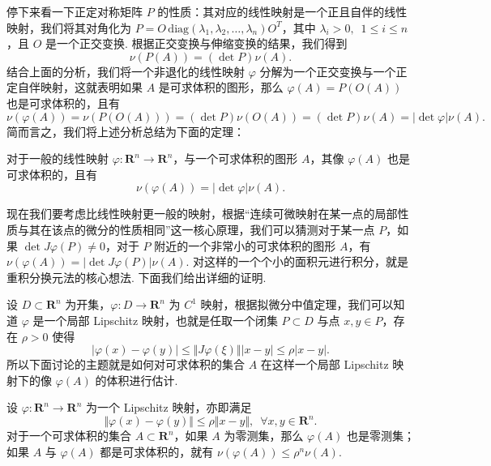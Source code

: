 停下来看一下正定对称矩阵 $P$ 的性质：其对应的线性映射是一个正且自伴的线性映射，我们将其对角化为 $P = O\,\mathrm{diag}(\lambda_1, \lambda_2, \dots, \lambda_n) O^T$，其中 $\lambda_i > 0,\enspace 1\leqslant i\leqslant n$，且 $O$ 是一个正交变换. 根据正交变换与伸缩变换的结果，我们得到 \[\nu(P(A)) = (\det P)\nu(A).\]
结合上面的分析，我们将一个非退化的线性映射 $\varphi$ 分解为一个正交变换与一个正定自伴映射，这就表明如果 $A$ 是可求体积的图形，那么 $\varphi(A) = P(O(A))$ 也是可求体积的，且有 \[\nu(\varphi(A)) = \nu(P(O(A))) = (\det P)\nu(O(A)) = (\det P)\nu(A) = \vert\det\varphi\vert \nu(A).\]
简而言之，我们将上述分析总结为下面的定理：

\begin{theorem}{}{}
    对于一般的线性映射 $\varphi: \mathbf{R}^n\to \mathbf{R}^n$，与一个可求体积的图形 $A$，其像 $\varphi(A)$ 也是可求体积的，且有 \[\nu(\varphi(A)) = \vert\det\varphi\vert \nu(A).\]
\end{theorem}

现在我们要考虑比线性映射更一般的映射，根据“连续可微映射在某一点的局部性质与其在该点的微分的性质相同”这一核心原理，我们可以猜测对于某一点 $P$，如果 $\det J\varphi(P)\neq 0$，对于 $P$ 附近的一个非常小的可求体积的图形 $A$，有 $\nu(\varphi(A)) = \vert\det J\varphi(P)\vert \nu(A)$. 对这样的一个个小的面积元进行积分，就是重积分换元法的核心想法. 下面我们给出详细的证明.

设 $D\subset \mathbf{R}^n$ 为开集，$\varphi: D\to \mathbf{R}^n$ 为 $C^1$ 映射，根据拟微分中值定理，我们可以知道 $\varphi$ 是一个局部 Lipschitz 映射，也就是任取一个闭集 $P\subset D$ 与点 $x, y\in P$，存在 $\rho > 0$ 使得 \[\vert \varphi(x) - \varphi(y)\vert \leqslant \Vert J\varphi(\xi)\Vert \vert x - y\vert \leqslant \rho \vert x - y\vert.\]
所以下面讨论的主题就是如何对可求体积的集合 $A$ 在这样一个局部 Lipschitz 映射下的像 $\varphi(A)$ 的体积进行估计.

\begin{lemma}{}{}
    设 $\varphi:\mathbf{R}^n\to \mathbf{R}^n$ 为一个 Lipschitz 映射，亦即满足\[\Vert \varphi(x) - \varphi(y)\Vert \leqslant \rho \Vert x - y\Vert,\enspace \forall x, y\in\mathbf{R}^n.\]
    对于一个可求体积的集合 $A\subset \mathbf{R}^n$，如果 $A$ 为零测集，那么 $\varphi(A)$ 也是零测集；如果 $A$ 与 $\varphi(A)$ 都是可求体积的，就有 $\nu(\varphi(A)) \leqslant \rho^n\nu(A)$.
\end{lemma}

